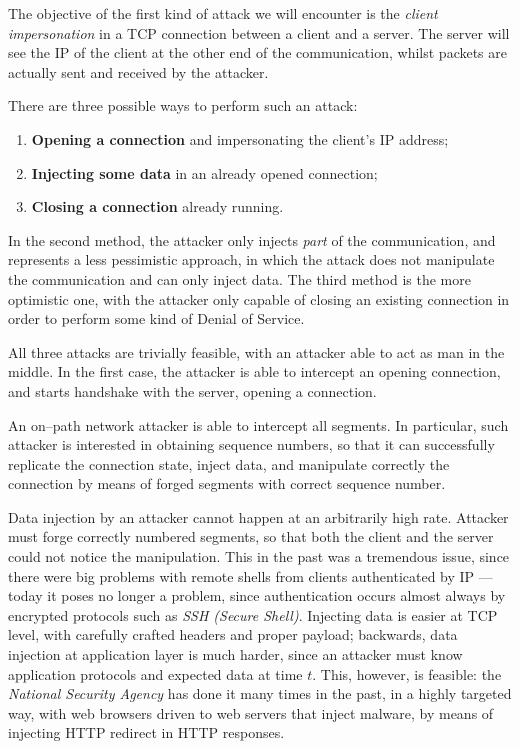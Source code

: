 \documentclass[10pt]{extreport}
\begin{document}
The objective of the first kind of attack we will encounter is the \emph{client
impersonation} in a TCP connection between a client and a server. The server
will see the IP of the client at the other end of the communication, whilst
packets are actually sent and received by the attacker.

There are three possible ways to perform such an attack:
\begin{enumerate}
    \item \textbf{Opening a connection} and impersonating the client's IP
        address;
    \item \textbf{Injecting some data} in an already opened connection;
    \item \textbf{Closing a connection} already running.
\end{enumerate}

In the second method, the attacker only injects \emph{part} of the
communication, and represents a less pessimistic approach, in which the attack
does not manipulate the communication and can only inject data. The third
method is the more optimistic one, with the attacker only capable of closing an
existing connection in order to perform some kind of Denial of Service.

All three attacks are trivially feasible, with an attacker able to act as man
in the middle. In the first case, the attacker is able to intercept an opening
connection, and starts handshake with the server, opening a connection.

An on--path network attacker is able to intercept all segments. In particular,
such attacker is interested in obtaining sequence numbers, so that it can
successfully replicate the connection state, inject data, and manipulate
correctly the connection by means of forged segments with correct sequence
number.

Data injection by an attacker cannot happen at an arbitrarily high rate.
Attacker must forge correctly numbered segments, so that both the client and
the server could not notice the manipulation. This in the past was a tremendous
issue, since there were big problems with remote shells from clients
authenticated by IP --- today it poses no longer a problem, since authentication
occurs almost always by encrypted protocols such as \emph{SSH (Secure Shell)}.
Injecting data is easier at TCP level, with carefully crafted headers and
proper payload; backwards, data injection at application layer is much harder,
since an attacker must know application protocols and expected data at time
$t$. This, however, is feasible: the \emph{National Security Agency} has done
it many times in the past, in a highly targeted way, with web browsers driven
to web servers that inject malware, by means of injecting HTTP redirect in HTTP
responses.
\end{document}
